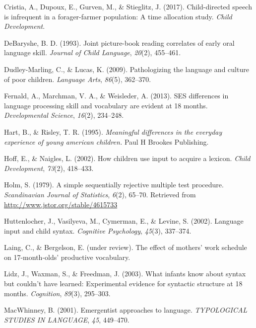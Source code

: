\documentclass[man]{apa6}
\theoremstyle{definition}
\theoremstyle{definition}
\theoremstyle{definition}
\theoremstyle{remark}
\begin{document}
\hypertarget{ref-cristia2017child}{}
Cristia, A., Dupoux, E., Gurven, M., \& Stieglitz, J. (2017).
Child-directed speech is infrequent in a forager-farmer population: A
time allocation study. \emph{Child Development}.

\hypertarget{ref-debaryshe1993joint}{}
DeBaryshe, B. D. (1993). Joint picture-book reading correlates of early
oral language skill. \emph{Journal of Child Language}, \emph{20}(2),
455--461.

\hypertarget{ref-dudley2009pathologizing}{}
Dudley-Marling, C., \& Lucas, K. (2009). Pathologizing the language and
culture of poor children. \emph{Language Arts}, \emph{86}(5), 362--370.

\hypertarget{ref-fernald2013ses}{}
Fernald, A., Marchman, V. A., \& Weisleder, A. (2013). SES differences
in language processing skill and vocabulary are evident at 18 months.
\emph{Developmental Science}, \emph{16}(2), 234--248.

\hypertarget{ref-hart1995meaningful}{}
Hart, B., \& Risley, T. R. (1995). \emph{Meaningful differences in the
everyday experience of young american children.} Paul H Brookes
Publishing.

\hypertarget{ref-hoff2002children}{}
Hoff, E., \& Naigles, L. (2002). How children use input to acquire a
lexicon. \emph{Child Development}, \emph{73}(2), 418--433.

\hypertarget{ref-holm1979simple}{}
Holm, S. (1979). A simple sequentially rejective multiple test
procedure. \emph{Scandinavian Journal of Statistics}, \emph{6}(2),
65--70. Retrieved from \url{http://www.jstor.org/stable/4615733}

\hypertarget{ref-huttenlocher2002language}{}
Huttenlocher, J., Vasilyeva, M., Cymerman, E., \& Levine, S. (2002).
Language input and child syntax. \emph{Cognitive Psychology},
\emph{45}(3), 337--374.

\hypertarget{ref-Laing_Bergelson_17}{}
Laing, C., \& Bergelson, E. (under review). The effect of mothers' work
schedule on 17-month-olds' productive vocabulary.

\hypertarget{ref-lidz2003infants}{}
Lidz, J., Waxman, S., \& Freedman, J. (2003). What infants know about
syntax but couldn't have learned: Experimental evidence for syntactic
structure at 18 months. \emph{Cognition}, \emph{89}(3), 295--303.

\hypertarget{ref-macwhinney2001emergentist}{}
MacWhinney, B. (2001). Emergentist approaches to language.
\emph{TYPOLOGICAL STUDIES IN LANGUAGE}, \emph{45}, 449--470.
\end{document}
